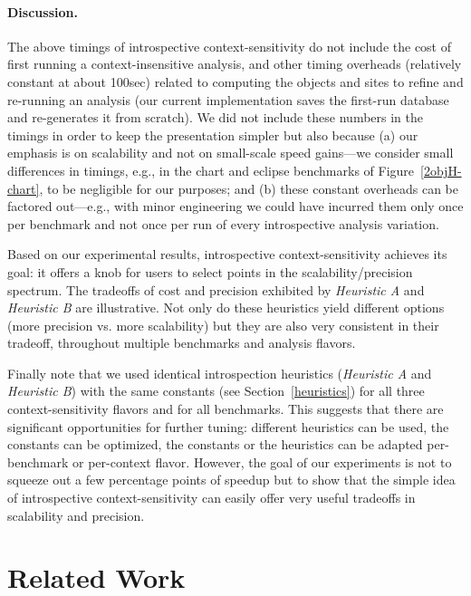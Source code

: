 \paragraph{Discussion.}

The above timings of introspective context-sensitivity do not include
the cost of first running a context-insensitive analysis, and other
timing overheads (relatively constant at about 100sec) related to
computing the objects and sites to refine and re-running an analysis
(our current implementation saves the first-run database and
re-generates it from scratch). We did not include these numbers in the
timings in order to keep the presentation simpler but also because (a)
our emphasis is on scalability and not on small-scale speed gains---we
consider small differences in timings, e.g., in the chart and eclipse
benchmarks of Figure~\ref{2objH-chart}, to be negligible for our
purposes; and (b) these constant overheads can be factored out---e.g.,
with minor engineering we could have incurred them only once per
benchmark and not once per run of every introspective analysis
variation.


Based on our experimental results, introspective context-sensitivity
achieves its goal: it offers a knob for users to select
points in the scalability/precision spectrum. The tradeoffs of cost
and precision exhibited by \emph{Heuristic A} and \emph{Heuristic B}
are illustrative. Not only do these heuristics yield different options
(more precision vs. more scalability) but they are also very
consistent in their tradeoff, throughout multiple benchmarks and
analysis flavors.

Finally note that we used identical introspection heuristics
(\emph{Heuristic A} and \emph{Heuristic B}) with the same constants
(see Section~\ref{heuristics}) for all three context-sensitivity
flavors and for all benchmarks. This suggests that there are
significant opportunities for further tuning: different heuristics can
be used, the constants can be optimized, the constants or the heuristics
can be adapted per-benchmark or per-context flavor. However, the goal
of our experiments is not to squeeze out a few percentage points of
speedup but to show that the simple idea of introspective
context-sensitivity can easily offer very useful tradeoffs in
scalability and precision.


\section{Related Work}
\label{sec:related}

